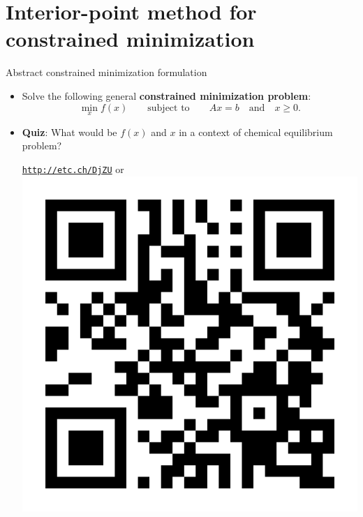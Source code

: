 \section{Interior-point method for constrained minimization}
%
%
\begin{frame}{Abstract constrained minimization formulation}
	\small
\begin{itemize}
\item Solve the following general \alert{\bf constrained minimization problem}:
\[
\min_{x}f(x)\qquad\text{subject to}\qquad Ax=b\quad\text{and}\quad x\geq0.
\]
\vskip -10pt
\pause
\item \alert{\textbf{Quiz}}: What would be $f(x)$ and $x$ in a context of chemical equilibrium problem?
%
\begin{center}
	\href{http://etc.ch/DjZU}{\textcolor{indigo(dye)}{\tt http://etc.ch/DjZU}} \quad or \quad 
	\includegraphics[height=0.13\columnwidth]{figures/numerical-methods-chemical-equilibrium/polls.png}
\end{center}
\hiddenpause
\end{itemize}
\end{frame}
%
